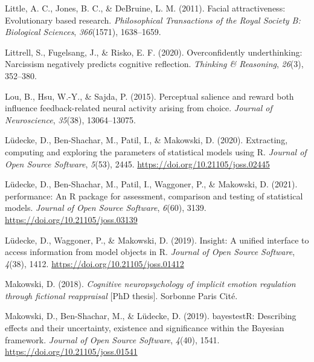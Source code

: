 \documentclass[
  man,mask,floatsintext]{apa6}
\newlength{\cslhangindent}
\newlength{\cslentryspacingunit} %
\newenvironment{CSLReferences}[2] %
 {%
  \setlength{\parindent}{0pt}
  \ifodd #1
  \let\oldpar\par
  \def\par{\hangindent=\cslhangindent\oldpar}
  \fi
  \setlength{\parskip}{#2\cslentryspacingunit}
 }%
 {}
\begin{document}
\begin{CSLReferences}{1}{0}
\leavevmode{}%
Little, A. C., Jones, B. C., \& DeBruine, L. M. (2011). Facial attractiveness: Evolutionary based research. \emph{Philosophical Transactions of the Royal Society B: Biological Sciences}, \emph{366}(1571), 1638--1659.

\leavevmode{}%
Littrell, S., Fugelsang, J., \& Risko, E. F. (2020). Overconfidently underthinking: Narcissism negatively predicts cognitive reflection. \emph{Thinking \& Reasoning}, \emph{26}(3), 352--380.

\leavevmode{}%
Lou, B., Hsu, W.-Y., \& Sajda, P. (2015). Perceptual salience and reward both influence feedback-related neural activity arising from choice. \emph{Journal of Neuroscience}, \emph{35}(38), 13064--13075.

\leavevmode{}%
Lüdecke, D., Ben-Shachar, M., Patil, I., \& Makowski, D. (2020). Extracting, computing and exploring the parameters of statistical models using {R}. \emph{Journal of Open Source Software}, \emph{5}(53), 2445. \url{https://doi.org/10.21105/joss.02445}

\leavevmode{}%
Lüdecke, D., Ben-Shachar, M., Patil, I., Waggoner, P., \& Makowski, D. (2021). {performance}: An {R} package for assessment, comparison and testing of statistical models. \emph{Journal of Open Source Software}, \emph{6}(60), 3139. \url{https://doi.org/10.21105/joss.03139}

\leavevmode{}%
Lüdecke, D., Waggoner, P., \& Makowski, D. (2019). Insight: A unified interface to access information from model objects in {R}. \emph{Journal of Open Source Software}, \emph{4}(38), 1412. \url{https://doi.org/10.21105/joss.01412}

\leavevmode{}%
Makowski, D. (2018). \emph{Cognitive neuropsychology of implicit emotion regulation through fictional reappraisal} {[}PhD thesis{]}. Sorbonne Paris Cit{é}.

\leavevmode{}%
Makowski, D., Ben-Shachar, M., \& Lüdecke, D. (2019). {bayestestR}: Describing effects and their uncertainty, existence and significance within the {Bayesian} framework. \emph{Journal of Open Source Software}, \emph{4}(40), 1541. \url{https://doi.org/10.21105/joss.01541}


\end{CSLReferences}
\end{document}
